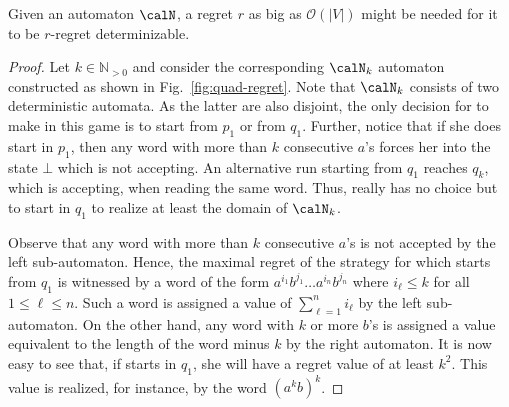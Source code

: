\documentclass[a4paper]{article}
\begin{document}
\begin{proposition}\label{pro:quad-regret-necessary}
	Given an automaton $\calN$, a regret $r$ as big as
	$\mathcal{O}(|V|)$ might be needed for it to be $r$-regret
	determinizable.
\end{proposition}
\begin{proof}
	Let $k \in \mathbb{N}_{> 0}$ and consider the corresponding $\calN_k$
	automaton constructed as shown in Fig.~\ref{fig:quad-regret}. Note
	that $\calN_k$ consists of two deterministic automata.
	As the latter are also disjoint, the only decision for
	\eve to make in this game is to start from $p_1$ or from $q_1$. Further,
	notice that if she does start in $p_1$, then any word with more than $k$
	consecutive $a$'s forces her into the state $\bot$ which is not
	accepting. An alternative run starting from $q_1$ reaches $q_k$, which
	is accepting, when reading the same word. Thus, \eve really has no
	choice but to start in $q_1$ to realize at least the domain of $\calN_k$.

	Observe that any word with more than $k$ consecutive $a$'s is not
	accepted by the left sub-automaton. Hence, the maximal regret of the
	strategy for \eve which starts from $q_1$ is witnessed by a word of the
	form
	\(
		a^{i_1} b^{j_1} \dots a^{i_n} b^{j_n}
	\)
	where $i_\ell \le k$ for all $1 \le \ell \le n$. Such a word is assigned
	a value of $\sum_{\ell = 1}^n i_\ell$ by the left sub-automaton. On the
	other hand, any word with $k$ or more $b$'s is assigned a value
	equivalent to the length of the word minus $k$ by the right automaton.
	It is now easy to see that, if \eve starts in $q_1$, she will have
	a regret value of at least $k^2$. This value is realized, for instance,
	by the word $(a^kb)^k$.
\end{proof}
\end{document}
